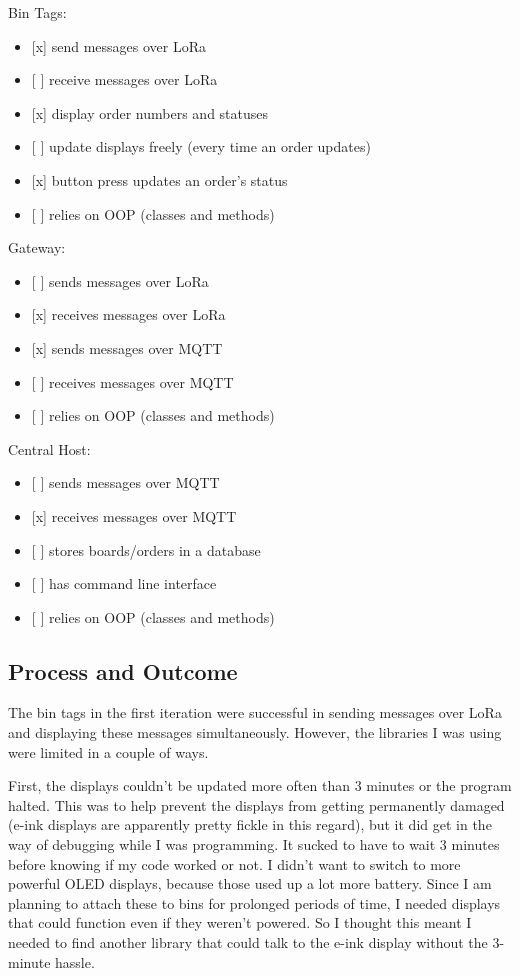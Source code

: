 \documentclass{article}
\begin{document}
Bin Tags:

\begin{itemize}
\item
  {[}x{]} send messages over LoRa
\item
  {[} {]} receive messages over LoRa
\item
  {[}x{]} display order numbers and statuses
\item
  {[} {]} update displays freely (every time an order updates)
\item
  {[}x{]} button press updates an order's status
\item
  {[} {]} relies on OOP (classes and methods)
\end{itemize}

Gateway:

\begin{itemize}
\item
  {[} {]} sends messages over LoRa
\item
  {[}x{]} receives messages over LoRa
\item
  {[}x{]} sends messages over MQTT
\item
  {[} {]} receives messages over MQTT
\item
  {[} {]} relies on OOP (classes and methods)
\end{itemize}

Central Host:

\begin{itemize}
\item
  {[} {]} sends messages over MQTT
\item
  {[}x{]} receives messages over MQTT
\item
  {[} {]} stores boards/orders in a database
\item
  {[} {]} has command line interface
\item
  {[} {]} relies on OOP (classes and methods)
\end{itemize}

\subsection{Process and Outcome}\label{process-and-outcome}

The bin tags in the first iteration were successful in sending messages
over LoRa and displaying these messages simultaneously. However, the
libraries I was using were limited in a couple of ways.

First, the displays couldn't be updated more often than 3 minutes or the
program halted. This was to help prevent the displays from getting
permanently damaged (e-ink displays are apparently pretty fickle in this
regard), but it did get in the way of debugging while I was programming.
It sucked to have to wait 3 minutes before knowing if my code worked or
not. I didn't want to switch to more powerful OLED displays, because
those used up a lot more battery. Since I am planning to attach these to
bins for prolonged periods of time, I needed displays that could
function even if they weren't powered. So I thought this meant I needed
to find another library that could talk to the e-ink display without the
3-minute hassle.
\end{document}
